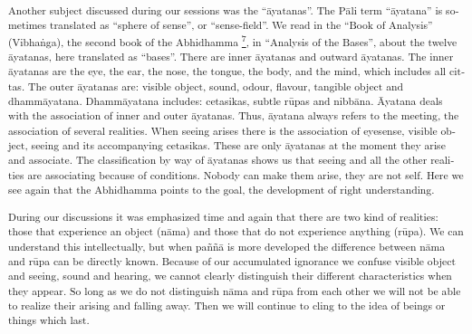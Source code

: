 \textsuperscript{\textdutch{Another subject discussed during our
sessions was the ``āyatanas''. T}\textenglish[variant=american]{he
P}\textdanish{ā}\textenglish[variant=american]{li term
}``āyatana''\textdutch{ is sometimes translated as
}``\textdutch{s}\textenglish[variant=american]{phere of
sense}''\textdutch{, or ``sense-field''.}\textenglish[variant=american]{
We read in the }``\textenglish[variant=american]{Book of Analysis}''
(Vibha\textitalian{ṅ}\textenglish[variant=american]{ga), the second book
of the Abhidhamma
\protect\hyperlink{sdfootnote7sym}{\textsuperscript{7}}}\textitalian{,
in }``\textenglish[variant=american]{Analysis of the
Bases}''\textenglish[variant=american]{, about the twelve
}\textdanish{ā}\textenglish[variant=american]{yatanas, here translated
as }``\textenglish[variant=american]{bases}''. \textdutch{There are
inner }\textdanish{ā}yatanas\textdutch{ and outward
}\textdanish{ā}yatanas\textdutch{. The inner
}\textdanish{ā}yatanas\textdutch{ are
}\textenglish[variant=american]{the eye, the ear, the nose, the tongue,
the body, }\textdutch{and }\textenglish[variant=american]{the
mind}\textdutch{, which includes all cittas. The outer
}\textdanish{ā}yatanas\textdutch{ are:
}\textenglish[variant=american]{visible object, sound, odour, flavour,
tangible object and }\textdutch{dhamm}\textdanish{ā}yatana.
\textdutch{Dhamm}\textdanish{ā}yatana \textdutch{includes: cetasikas,
subtle rūpas and nibbāna. Ā}yatana\textdutch{ deals with the association
of inner and outer }\textdanish{ā}yatanas\textdutch{. Thus, āyatana
always refers to the meeting, the association of several realities. When
seeing arises there is the association of eyesense, visible object,
seeing and its accompanying cetasikas. These are only āyatanas at the
moment they arise and associate. T}\textenglish[variant=american]{he
classification by way of }\textdanish{ā}yatanas \textdutch{shows us that
seeing and all the other realities are associating because of
conditions. Nobody can make them arise, they are not self.
}\textenglish[variant=american]{Here we see again that the Abhidhamma
points to the goal, the development of right understanding.}}

\textsuperscript{\textdutch{During our discussions it was emphasized
time and again that there are two kind of realities: those that
experience an object (nāma) and those that do not experience anything
(rūpa). We can understand this intellectually, but when paññā is more
developed the difference between nāma and rūpa can be directly known.
}\textenglish[variant=american]{Because of our accumulated ignorance we
confuse visible object and seeing, sound and hearing, we cannot clearly
distinguish their different characteristics when they appear. So long as
we do not distinguish n}\textdanish{ā}\textenglish[variant=american]{ma
and r}ū\textenglish[variant=american]{pa from each other we will not be
able to realize their arising and falling away. Then we will continue to
cling to the idea of beings or things which last. }}

